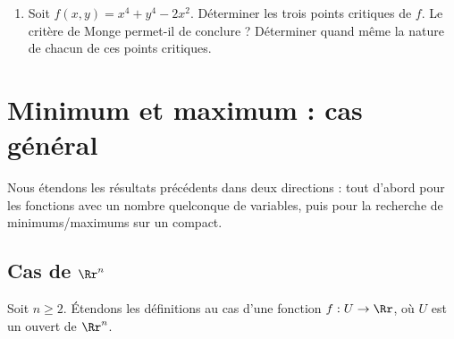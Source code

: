 \documentclass[11pt, class=report,crop=false]{standalone}
\begin{document}
\begin{miniexercices}
\begin{enumerate}
        
        \item Soit $f(x,y)=x^4+y^4-2x^2$. Déterminer les trois points critiques de $f$.
        Le critère de Monge permet-il de conclure ?
        Déterminer quand même la nature de chacun de ces points critiques.



    \end{enumerate}
\end{miniexercices}

 


\section{Minimum et maximum : cas général}

Nous étendons les résultats précédents dans deux directions : tout d'abord pour les fonctions avec un nombre quelconque de variables, puis pour la recherche de minimums/maximums sur un compact.


\subsection{Cas de $\Rr^n$}

Soit $n\ge2$.
Étendons les définitions au cas d'une fonction $f : U\to \Rr$, o\`u $U$ est un ouvert de $\Rr^n$.
\end{document}
